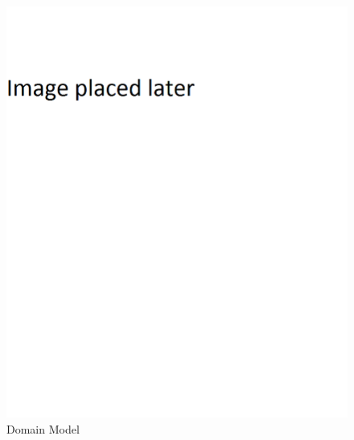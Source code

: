 	
		\begin{figure}[!ht]
		\centering
		\includegraphics[scale=0.5, width=15cm, keepaspectratio]{./Images/default.png}
		\caption{Domain Model}
		\label{Connection to the Eye tribe camera}
	\end{figure}

